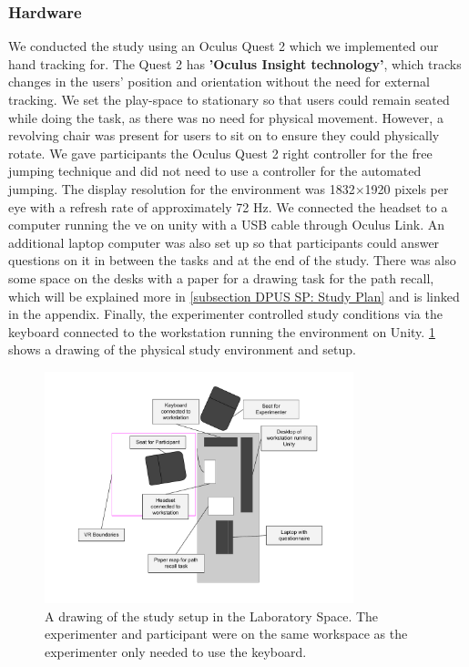 \subsubsection{Hardware}
\label{subsubsection DPUS SP SS: Hardware}
We conducted the study using an Oculus Quest 2 which we implemented our hand tracking for. The Quest 2 has \textbf{'Oculus Insight technology'}, which tracks changes in the users' position and orientation without the need for external tracking. We set the play-space to stationary so that users could remain seated while doing the task, as there was no need for physical movement. However, a revolving chair was present for users to sit on to ensure they could physically rotate. We gave participants the Oculus Quest 2 right controller for the free jumping technique and did not need to use a controller for the automated jumping. The display resolution for the environment was 1832×1920 pixels per eye with a refresh rate of approximately 72 Hz. We connected the headset to a computer running the \acrshort{ve} on unity with a USB cable through Oculus Link. An additional laptop computer was also set up so that participants could answer questions on it in between the tasks and at the end of the study. There was also some space on the desks with a paper for a drawing task for the path recall, which will be explained more in \cref{subsection DPUS SP: Study Plan} and is linked in the appendix. Finally, the experimenter controlled study conditions via the keyboard connected to the workstation running the environment on Unity. \cref{fig:study-setup} shows a drawing of the physical study environment and setup.

\begin{figure}[]
	\centering 
	\includegraphics[width=0.8\textwidth]{images/study-setup.pdf}
	\caption{A drawing of the study setup in the Laboratory Space. The experimenter and participant were on the same workspace as the experimenter only needed to use the keyboard.}
	\label{fig:study-setup}
\end{figure}
 
